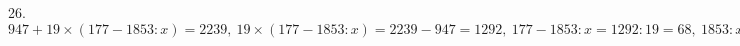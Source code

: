 26. $947+19\times(177-1853:x)=2239,\ 19\times(177-1853:x)=2239-947=1292,\ 177-1853:x=1292:19=68,\ 1853:x=177-68=109,\ x=1853:109=17.$\\
